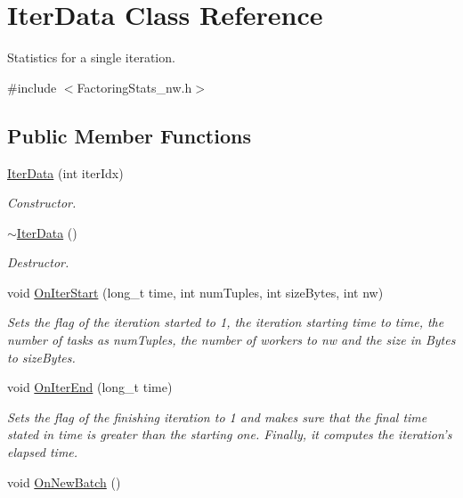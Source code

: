 \hypertarget{class_iter_data}{\section{Iter\-Data Class Reference}
\label{class_iter_data}
}


Statistics for a single iteration.  




{\ttfamily \#include $<$Factoring\-Stats\-\_\-nw.\-h$>$}

\subsection*{Public Member Functions}
\begin{DoxyCompactItemize}
\item 
\hyperlink{class_iter_data_afec41827476662cb1cac6d0f00931a80}{Iter\-Data} (int iter\-Idx)
\begin{DoxyCompactList}\small\item\em Constructor. \end{DoxyCompactList}\item 
\hypertarget{class_iter_data_a14ebf5f539d8941043b026513908f281}{\hyperlink{class_iter_data_a14ebf5f539d8941043b026513908f281}{$\sim$\-Iter\-Data} ()}\label{class_iter_data_a14ebf5f539d8941043b026513908f281}

\begin{DoxyCompactList}\small\item\em Destructor. \end{DoxyCompactList}\item 
void \hyperlink{class_iter_data_ab6cc53385450be8716cae65eebb7757e}{On\-Iter\-Start} (long\-\_\-t time, int num\-Tuples, int size\-Bytes, int nw)
\begin{DoxyCompactList}\small\item\em Sets the flag of the iteration started to 1, the iteration starting time to {\itshape time}, the number of tasks as {\itshape num\-Tuples}, the number of workers to {\itshape nw} and the size in Bytes to {\itshape size\-Bytes}. \end{DoxyCompactList}\item 
void \hyperlink{class_iter_data_a4043a0cbd3de9f8e7e4b3438b6b861b2}{On\-Iter\-End} (long\-\_\-t time)
\begin{DoxyCompactList}\small\item\em Sets the flag of the finishing iteration to 1 and makes sure that the final time stated in {\itshape time} is greater than the starting one. Finally, it computes the iteration's elapsed time. \end{DoxyCompactList}\item 
\hypertarget{class_iter_data_ad771031edb8d8dfa35691bba78b94fd7}{void \hyperlink{class_iter_data_ad771031edb8d8dfa35691bba78b94fd7}{On\-New\-Batch} ()}\label{class_iter_data_ad771031edb8d8dfa35691bba78b94fd7}


\end{DoxyCompactItemize}
